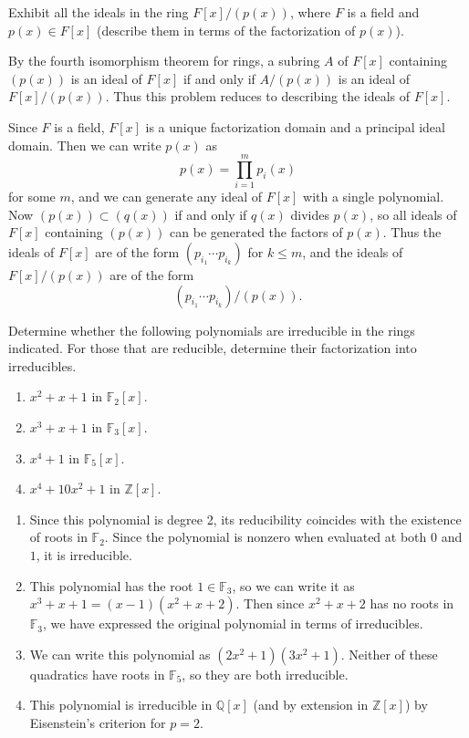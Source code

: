 \documentclass[10pt]{report}
\begin{document}

\begin{exer}[DF 9.2: 5]
	Exhibit all the ideals in the ring $F[x]/(p(x))$, where $F$ is a field and $p(x) \in F[x]$ (describe them in terms of the factorization of $p(x)$).
\end{exer}
By the fourth isomorphism theorem for rings, a subring $A$ of $F[x]$ containing $(p(x))$ is an ideal of $F[x]$ if and only if $A/(p(x))$ is an ideal of $F[x]/(p(x))$. Thus this problem reduces to describing the ideals of $F[x]$.

Since $F$ is a field, $F[x]$ is a unique factorization domain and a principal ideal domain. Then we can write $p(x)$ as
\[
	p(x) = \prod_{i=1}^m p_i(x)
\] for some $m$, and we can generate any ideal of $F[x]$ with a single polynomial. Now $(p(x)) \subset (q(x))$ if and only if $q(x)$ divides $p(x)$, so all ideals of $F[x]$ containing $(p(x))$ can be generated the factors of $p(x)$. Thus the ideals of $F[x]$ are of the form $(p_{i_1}\cdots p_{i_k})$ for $k \leq m$, and the ideals of $F[x]/(p(x))$ are of the form
\[
	(p_{i_1}\cdots p_{i_k}) / (p(x)) .
\] 

\begin{exer}[DF 9.4: 1]
	Determine whether the following polynomials are irreducible in the rings indicated. For those that are reducible, determine their factorization into irreducibles.
	\begin{enumerate}
		\item $x^2+x+1$ in $\mathbb{F}_2[x]$.
		\item $x^3+x+1$ in $\mathbb{F}_3[x]$.
		\item $x^4+1$ in $\mathbb{F}_5[x]$.
		\item $x^4+10x^2+1$ in $\mathbb{Z}[x]$.
	\end{enumerate}
\end{exer}
\begin{enumerate}
	\item Since this polynomial is degree 2, its reducibility coincides with the existence of roots in $\mathbb{F}_2$. Since the polynomial is nonzero when evaluated at both $0$ and $1$, it is irreducible.
	\item This polynomial has the root $1 \in \mathbb{F}_3$, so we can write it as $x^3+x+1 = (x-1)(x^2+x+2)$. Then since $x^2+x+2$ has no roots in $\mathbb{F}_3$, we have expressed the original polynomial in terms of irreducibles.
	\item We can write this polynomial as $(2x^2+1)(3x^2+1)$. Neither of these quadratics have roots in $\mathbb{F}_5$, so they are both irreducible.
	\item This polynomial is irreducible in $\mathbb{Q}[x]$ (and by extension in $\mathbb{Z}[x]$) by Eisenstein's criterion for $p=2$.
\end{enumerate}
\end{document}
